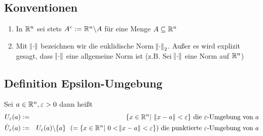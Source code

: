 \subsection{Konventionen}
\begin{enumerate}[label= (\alph*)]
    \item In $\mathbb{R}^n$ sei stets $A^c := \mathbb{R}^n \backslash A$ für eine Menge $A \subseteq \mathbb{R}^n$
    \item Mit $\norm{\cdot}$ bezeichnen wir die euklidische Norm $\norm{\cdot}_2$.
    Außer es wird explizit gesagt, dass $\norm{\cdot}$ eine allgemeine Norm ist
    (z.B. \glqq{} Sei $\norm{\cdot}$ eine Norm   auf $\mathbb{R}^n$)
\end{enumerate}

\subsection{Definition Epsilon-Umgebung}
Sei $a \in \mathbb{R}^n, \varepsilon > 0$ dann heißt
\begin{eqnarray*}
    U_\varepsilon(a) &:=& \{ x \in \mathbb{R}^n |\ \norm{x-a} < \varepsilon \} \text{ die }
    \varepsilon \text{-Umgebung von }a\\
    \dot{U}_\varepsilon(a) &:=& U_\varepsilon(a) \backslash \{a \}
    \ \ ( =\{ x \in \mathbb{R}^n |\ 0<\norm{x-a}<\varepsilon \} ) \text{ die punktierte }
    \varepsilon \text{-Umgebung von }a
\end{eqnarray*}

